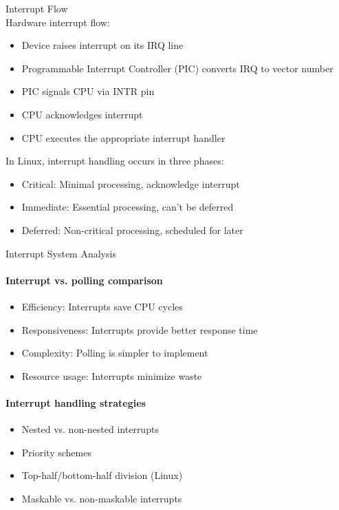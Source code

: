 \begin{definition}{Interrupt Flow}\\
    Hardware interrupt flow:
    \begin{itemize}
        \item Device raises interrupt on its IRQ line
        \item Programmable Interrupt Controller (PIC) converts IRQ to vector number
        \item PIC signals CPU via INTR pin
        \item CPU acknowledges interrupt
        \item CPU executes the appropriate interrupt handler
    \end{itemize}
        In Linux, interrupt handling occurs in three phases:
            \begin{itemize}
                \item Critical: Minimal processing, acknowledge interrupt
                \item Immediate: Essential processing, can't be deferred
                \item Deferred: Non-critical processing, scheduled for later
            \end{itemize}
\end{definition}

\multend


\begin{KR}{Interrupt System Analysis}
    \paragraph{Interrupt vs. polling comparison}
    \begin{itemize}
        \item Efficiency: Interrupts save CPU cycles
        \item Responsiveness: Interrupts provide better response time
        \item Complexity: Polling is simpler to implement
        \item Resource usage: Interrupts minimize waste
    \end{itemize}
    
    \paragraph{Interrupt handling strategies}
    \begin{itemize}
        \item Nested vs. non-nested interrupts
        \item Priority schemes
        \item Top-half/bottom-half division (Linux)
        \item Maskable vs. non-maskable interrupts
    \end{itemize}
\end{KR}

